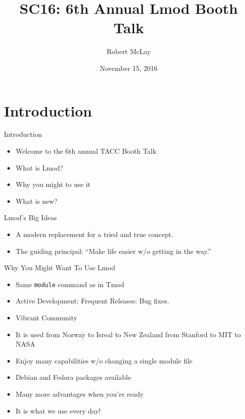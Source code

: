 \documentclass{beamer}
\title{SC16: 6th Annual Lmod Booth Talk}
\author{Robert McLay}
\institute{The Texas Advanced Computing Center}
\date{November 15, 2016}  %
\begin{document}
\begin{frame}
  \titlepage
\end{frame}

\section{Introduction}

\begin{frame}{Introduction}
  \begin{itemize}
    \item Welcome to the 6th annual TACC Booth Talk
    \item What is Lmod?
    \item Why you might to use it
    \item What is new?
  \end{itemize}
\end{frame}

\begin{frame}{Lmod's Big Ideas}
  \begin{itemize}
    \item A modern replacement for a tried and true concept.
    \item The guiding principal: ``Make life easier w/o getting in
      the way.''
  \end{itemize}
\end{frame}

\begin{frame}{Why You Might Want To Use Lmod}
  \begin{itemize}
    \item Same \texttt{module} command as in Tmod
    \item Active Development;  Frequent Releases; Bug fixes.
    \item Vibrant Community
    \item It is used from Norway to Isreal to New Zealand from Stanford to MIT to NASA
    \item Enjoy many capabilities w/o changing a single module file
    \item Debian and Fedora packages available
    \item Many more advantages when you're ready
    \item It is what we use every day!
  \end{itemize}
\end{frame}
\end{document}
